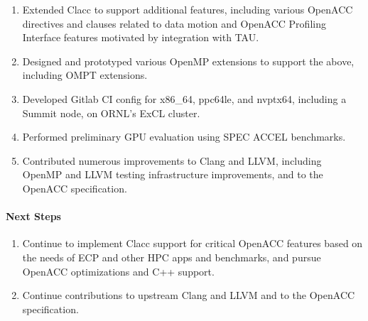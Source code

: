 \begin{enumerate}
\item
  Extended Clacc to support additional features, including various
  OpenACC directives and clauses related to data motion and OpenACC
  Profiling Interface features motivated by integration with TAU.
\item
  Designed and prototyped various OpenMP extensions to support the
  above, including OMPT extensions.
\item
  Developed Gitlab CI config for x86\_64, ppc64le, and nvptx64,
  including a Summit node, on ORNL's ExCL cluster.
\item
  Performed preliminary GPU evaluation using SPEC ACCEL benchmarks.
\item
  Contributed numerous improvements to Clang and LLVM, including
  OpenMP and LLVM testing infrastructure improvements, and to the
  OpenACC specification.
\end{enumerate}


\paragraph{Next Steps}

\begin{enumerate}
\item
  Continue to implement Clacc support for critical OpenACC features
  based on the needs of ECP and other HPC apps and benchmarks, and
  pursue OpenACC optimizations and C++ support.
\item
  Continue contributions to upstream Clang and LLVM and to the OpenACC
  specification.
\end{enumerate}
